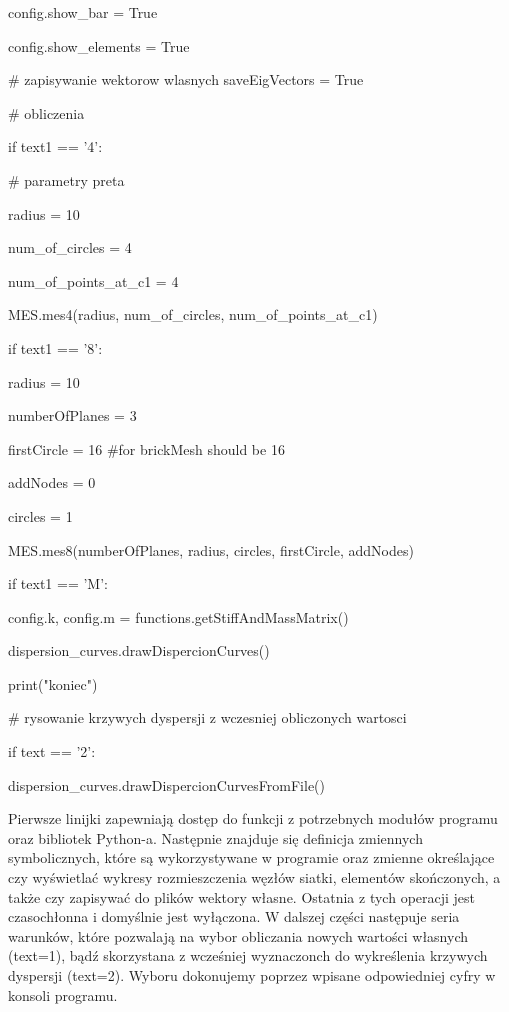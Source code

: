         config.show\_bar = True

        config.show\_elements = True

\vspace{3mm}

        \# zapisywanie wektorow wlasnych
        saveEigVectors = True

\vspace{3mm}
        \# obliczenia

        if text1 == '4':

            \# parametry preta

            radius = 10

            num\_of\_circles = 4

            num\_of\_points\_at\_c1 = 4

            MES.mes4(radius, num\_of\_circles, num\_of\_points\_at\_c1)

\vspace{3mm}

        if text1 == '8':

            radius = 10

            numberOfPlanes = 3

            firstCircle = 16 \#for brickMesh should be 16

            addNodes = 0

            circles = 1

            MES.mes8(numberOfPlanes, radius, circles, firstCircle, addNodes)

\vspace{3mm}
        if text1 == 'M':

            config.k, config.m = functions.getStiffAndMassMatrix()

        dispersion\_curves.drawDispercionCurves()

        print("koniec")

\vspace{3mm}
    \# rysowanie krzywych dyspersji z wczesniej obliczonych wartosci

    if text == '2':

        dispersion\_curves.drawDispercionCurvesFromFile()

\vspace{3mm}
Pierwsze linijki zapewniają dostęp do funkcji z potrzebnych modułów programu oraz bibliotek Python-a. Następnie znajduje się definicja zmiennych symbolicznych, które są wykorzystywane w programie oraz zmienne określające czy wyświetlać wykresy rozmieszczenia węzłów siatki, elementów skończonych, a także czy zapisywać do plików wektory własne. Ostatnia z tych operacji jest czasochłonna i domyślnie jest wyłączona. W dalszej części następuje seria warunków, które pozwalają na wybor obliczania nowych wartości własnych (text=1), bądź skorzystana z wcześniej wyznaczonch do wykreślenia krzywych dyspersji (text=2). Wyboru dokonujemy poprzez wpisane odpowiedniej cyfry w konsoli programu. 

